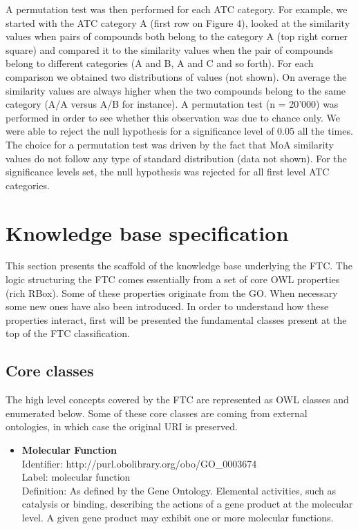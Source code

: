 \documentclass{bioinfo}
\begin{document}
A permutation test was then performed for each ATC category. For example, we started with the ATC 
category A (first row on Figure 4), looked at the similarity values when pairs of compounds both belong 
to the category A (top right corner square) and compared it to the similarity values when the pair of compounds 
belong to different categories (A and B, A and C and so forth). For each comparison we obtained two distributions of 
values (not shown). On average the similarity values are always higher when the two compounds 
belong to the same category (A/A versus A/B for instance). A permutation test (n = 20'000) was 
performed in order to see whether this observation was due to chance only. We were able to reject the null 
hypothesis for a significance level of 0.05 all the times. 
The choice for a permutation test was driven by the fact that MoA similarity values do not follow any type 
of standard distribution (data not shown). For the significance levels set, the null hypothesis was rejected for 
all first level ATC categories.

\section{Knowledge base specification}\label{specs}
This section presents the scaffold of the knowledge base underlying the FTC. 
The logic structuring the FTC comes essentially from a set of core OWL properties (rich RBox). 
Some of these properties originate from the GO. When necessary some new ones have also been introduced. 
In order to understand how these properties interact, first will be presented the fundamental classes present 
at the top of the FTC classification.

\subsection{Core classes}
The high level concepts covered by the FTC are represented as OWL classes and enumerated below. 
Some of these core classes are coming from external ontologies, in which case the original URI is preserved.


\begin{itemize}
\item \textbf{Molecular Function} \\
Identifier: http://purl.obolibrary.org/obo/GO\_0003674 \\
Label: molecular function \\
Definition: As defined by the Gene Ontology. Elemental activities, such as catalysis or binding, describing 
the actions of a gene product at the molecular level. A given gene product may exhibit one or more molecular functions.
\end{itemize}
\end{document}
